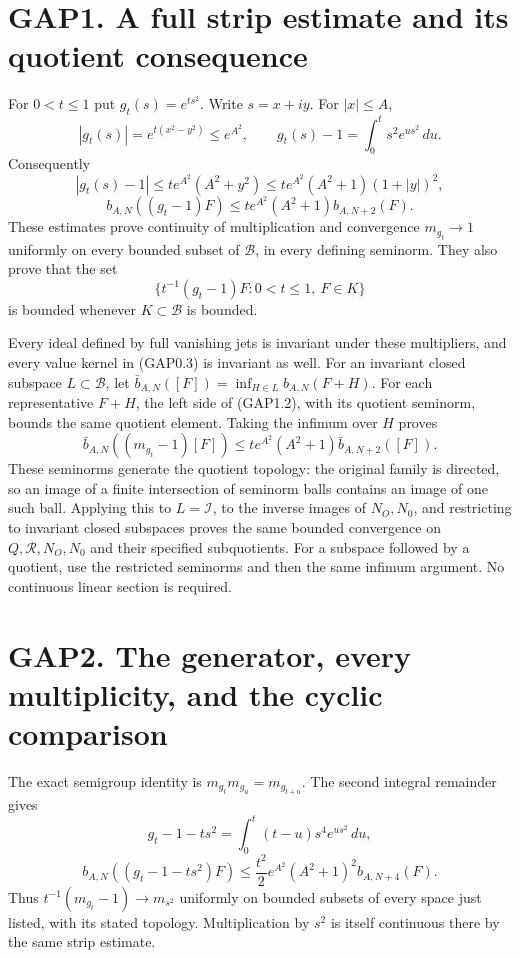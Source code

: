 \section{GAP1. A full strip estimate and its quotient
consequence}\label{gap1.-a-full-strip-estimate-and-its-quotient-consequence}

For \(0<t\le1\) put \(g_t(s)=e^{ts^2}\). Write \(s=x+iy\). For
\(|x|\le A\), \[
|g_t(s)|=e^{t(x^2-y^2)}\le e^{A^2},\qquad
g_t(s)-1=\int_0^t s^2e^{us^2}\,du.
\tag{GAP1.1}
\] Consequently \[
|g_t(s)-1|\le t e^{A^2}(A^2+y^2)
\le t e^{A^2}(A^2+1)(1+|y|)^2,
\] \[
\boxed{b_{A,N}((g_t-1)F)
\le t e^{A^2}(A^2+1)b_{A,N+2}(F).}
\tag{GAP1.2}
\] These estimates prove continuity of multiplication and convergence
\(m_{g_t}\to1\) uniformly on every bounded subset of \(\mathcal B\), in
every defining seminorm. They also prove that the set \[
\{t^{-1}(g_t-1)F:0<t\le1,\ F\in K\}
\tag{GAP1.3}
\] is bounded whenever \(K\subset\mathcal B\) is bounded.

Every ideal defined by full vanishing jets is invariant under these
multipliers, and every value kernel in (GAP0.3) is invariant as well.
For an invariant closed subspace \(L\subset\mathcal B\), let
\(\bar b_{A,N}([F])=\inf_{H\in L}b_{A,N}(F+H)\). For each representative
\(F+H\), the left side of (GAP1.2), with its quotient seminorm, bounds
the same quotient element. Taking the infimum over \(H\) proves \[
\bar b_{A,N}((m_{g_t}-1)[F])
\le t e^{A^2}(A^2+1)\bar b_{A,N+2}([F]).
\tag{GAP1.4}
\] These seminorms generate the quotient topology: the original family
is directed, so an image of a finite intersection of seminorm balls
contains an image of one such ball. Applying this to \(L=\mathcal I\),
to the inverse images of \(N_O,N_0\), and restricting to invariant
closed subspaces proves the same bounded convergence on
\(Q,\mathcal R,N_O,N_0\) and their specified subquotients. For a
subspace followed by a quotient, use the restricted seminorms and then
the same infimum argument. No continuous linear section is required.

\section{GAP2. The generator, every multiplicity, and the cyclic
comparison}\label{gap2.-the-generator-every-multiplicity-and-the-cyclic-comparison}

The exact semigroup identity is \(m_{g_t}m_{g_u}=m_{g_{t+u}}\). The
second integral remainder gives \[
g_t-1-ts^2=\int_0^t(t-u)s^4e^{us^2}\,du,
\] \[
b_{A,N}((g_t-1-ts^2)F)
\le\frac{t^2}{2}e^{A^2}(A^2+1)^2b_{A,N+4}(F).
\tag{GAP2.1}
\] Thus \(t^{-1}(m_{g_t}-1)\to m_{s^2}\) uniformly on bounded subsets of
every space just listed, with its stated topology. Multiplication by
\(s^2\) is itself continuous there by the same strip estimate.

